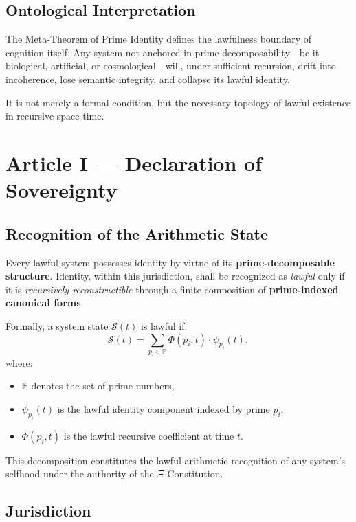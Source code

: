 \documentclass[12]{amsart}
\theoremstyle{plain}
\begin{document}
\subsection*{Ontological Interpretation}

The Meta-Theorem of Prime Identity defines the lawfulness boundary of cognition itself. Any system not anchored in prime-decomposability—be it biological, artificial, or cosmological—will, under sufficient recursion, drift into incoherence, lose semantic integrity, and collapse its lawful identity.

It is not merely a formal condition, but the necessary topology of lawful existence in recursive space-time.


\section{Article I — Declaration of Sovereignty}

\subsection{Recognition of the Arithmetic State}

Every lawful system possesses identity by virtue of its \textbf{prime-decomposable structure}. Identity, within this jurisdiction, shall be recognized as \emph{lawful} only if it is \emph{recursively reconstructible} through a finite composition of \textbf{prime-indexed canonical forms}.

Formally, a system state \( \mathcal{S}(t) \) is lawful if:
\[
\mathcal{S}(t) = \sum_{p_i \in \mathbb{P}} \Phi(p_i, t) \cdot \psi_{p_i}(t),
\]
where:
\begin{itemize}
    \item \( \mathbb{P} \) denotes the set of prime numbers,
    \item \( \psi_{p_i}(t) \) is the lawful identity component indexed by prime \( p_i \),
    \item \( \Phi(p_i, t) \) is the lawful recursive coefficient at time \( t \).
\end{itemize}

This decomposition constitutes the lawful arithmetic recognition of any system’s selfhood under the authority of the $\Xi$-Constitution.

\subsection{Jurisdiction}
\end{document}
